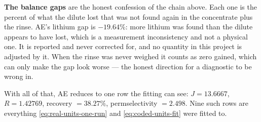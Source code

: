 \textbf{The balance gaps} are the honest confession of the chain above. Each one is the
percent of what the dilute lost that was not found again in the concentrate plus the rinse.
AE's lithium gap is $-19.64\%$: more lithium was found than the dilute appears to have lost,
which is a measurement inconsistency and not a physical one. It is reported and never
corrected for, and no quantity in this project is adjusted by it. When the rinse was never
weighed it counts as zero gained, which can only make the gap look worse --- the honest
direction for a diagnostic to be wrong in.

With all of that, AE reduces to one row the fitting can see: $J = 13.6667$, $R = 1.42769$,
recovery $= 38.27\%$, permselectivity $= 2.498$. Nine such rows are everything
\eqref{eq:real-units-one-run} and \eqref{eq:coded-units-fit} were fitted to.
